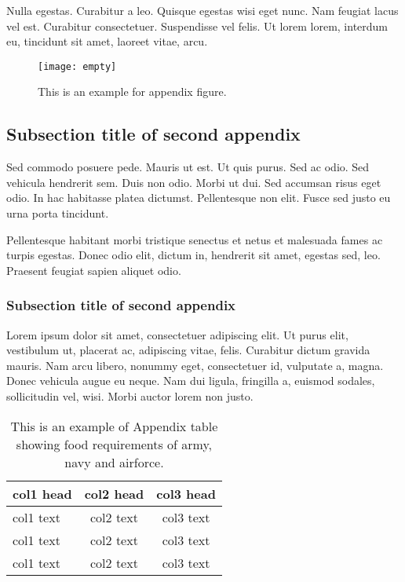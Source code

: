 \documentclass[proof]{WileyASNA-v1}
\begin{document}
Nulla egestas. Curabitur a leo. Quisque egestas wisi eget nunc. Nam feugiat lacus vel est. Curabitur consectetuer.
Suspendisse vel felis. Ut lorem lorem, interdum eu, tincidunt sit amet, laoreet vitae, arcu. 

\begin{figure}[t]
\centerline{\texttt{[image: empty]}}
\caption{This is an example for appendix figure.\label{fig5}}
\end{figure}

\subsection{Subsection title of second appendix\label{app2.1a}}

Sed commodo posuere pede. Mauris ut est. Ut quis purus. Sed ac odio. Sed vehicula hendrerit sem. Duis non odio.
Morbi ut dui. Sed accumsan risus eget odio. In hac habitasse platea dictumst. Pellentesque non elit. Fusce sed justo
eu urna porta tincidunt. 

Pellentesque habitant morbi tristique senectus et netus et malesuada fames ac turpis egestas. Donec odio elit,
dictum in, hendrerit sit amet, egestas sed, leo. Praesent feugiat sapien aliquet odio. 

\subsubsection{Subsection title of second appendix\label{app2.1.1a}}

Lorem ipsum dolor sit amet, consectetuer adipiscing elit. Ut purus elit, vestibulum ut, placerat ac, adipiscing vitae,
felis. Curabitur dictum gravida mauris. Nam arcu libero, nonummy eget, consectetuer id, vulputate a, magna. Donec
vehicula augue eu neque. 
Nam dui ligula, fringilla a, euismod sodales, sollicitudin vel, wisi. Morbi auctor lorem non justo. 

\begin{center}
\begin{table}[t]%
\centering
\caption{This is an example of Appendix table showing food requirements of army, navy and airforce.\label{tab4}}%
\begin{tabular*}{20pc}{@{\extracolsep\fill}lcc@{\extracolsep\fill}}%
\toprule
\textbf{col1 head} & \textbf{col2 head} & \textbf{col3 head} \\
\midrule
col1 text & col2 text & col3 text \\
col1 text & col2 text & col3 text \\
col1 text & col2 text & col3 text\\
\bottomrule
\end{tabular*}
\end{table}
\end{center}
\end{document}
